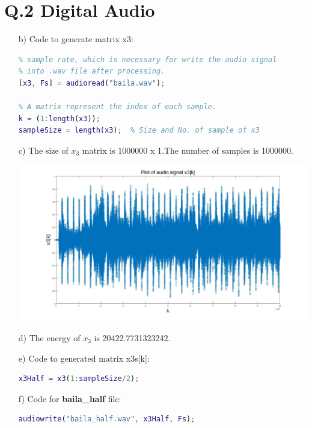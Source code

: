 \documentclass{article}
\begin{document}
	\section*{Q.2 Digital Audio}
	\begin{enumerate}
		\item[b)] Code to generate matrix x3:
		
\begin{lstlisting}[language=Matlab]
% Read the audio signal and store it into matrix x3. Fs is the 
% sample rate, which is necessary for write the audio signal 
% into .wav file after processing.
[x3, Fs] = audioread("baila.wav"); 

% A matrix represent the index of each sample.
k = (1:length(x3));
sampleSize = length(x3);  % Size and No. of sample of x3
\end{lstlisting}
		
		\item[c)] The size of $x_3$ matrix is 1000000 x 1.The number of samples is 1000000.
		
		\includegraphics[width=\textwidth]{Q2Plot.jpg}
		
		\item[d)] The energy of $x_3$ is 20422.7731323242.
		
		\item[e)] Code to generated matrix x3s[k]:
		
\begin{lstlisting}[language=Matlab]
% Generate matrix x3s[k] by keeping the first half of x3
x3Half = x3(1:sampleSize/2); 
\end{lstlisting}

		\item[f)] Code for \textbf{baila\_half} file:
		
\begin{lstlisting}[language=Matlab]
% Write x3s[k] into an output audio file.
audiowrite("baila_half.wav", x3Half, Fs);
\end{lstlisting}

	\end{enumerate}
\end{document}
